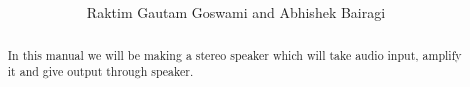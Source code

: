 \documentclass[journal,12pt,twocolumn]{IEEEtran}
\begin{document}
\let\StandardTheFigure\thefigure
\renewcommand{\thefigure}{\theproblem}



\makeatletter
{}
\makeatother

\let\StandardTheFigure\thefigure
\let\StandardTheTable\thetable





\def\putbox#1#2#3{\makebox[0in][l]{\makebox[#1][l]{}\raisebox{\baselineskip}[0in][0in]{\raisebox{#2}[0in][0in]{#3}}}}
     \def\rightbox#1{\makebox[0in][r]{#1}}
     \def\centbox#1{\makebox[0in]{#1}}
     \def\topbox#1{\raisebox{-\baselineskip}[0in][0in]{#1}}
     \def\midbox#1{\raisebox{-0.5\baselineskip}[0in][0in]{#1}}

\vspace{3cm}

\title{ 
}

\author{Raktim Gautam Goswami and Abhishek Bairagi%
	
	
}	

\maketitle

\tableofcontents
\bigskip

\begin{abstract}
	
	In this manual we will be making a stereo speaker which will take audio input, 
amplify it and give output through speaker.
	
\end{abstract}

\end{document}
